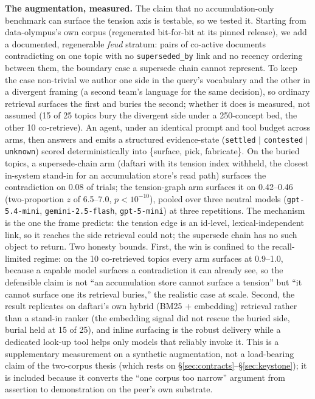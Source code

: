 \documentclass[11pt]{article}
\begin{document}
\textbf{The augmentation, measured.} The claim that no accumulation-only benchmark can surface the
tension axis is testable, so we tested it. Starting from data-olympus's own corpus (regenerated
bit-for-bit at its pinned release), we add a documented, regenerable \emph{feud} stratum: pairs of
co-active documents contradicting on one topic with no \texttt{superseded\_by} link and no recency
ordering between them, the boundary case a supersede chain cannot represent. To keep the case
non-trivial we author one side in the query's vocabulary and the other in a divergent framing (a
second team's language for the same decision), so ordinary retrieval surfaces the first and
buries the second; whether it does is measured, not assumed (15 of 25 topics bury the divergent
side under a 250-concept bed, the other 10 co-retrieve). An agent, under an identical prompt and
tool budget across arms, then answers and emits a structured evidence-state (\texttt{settled}
$\mid$ \texttt{contested} $\mid$ \texttt{unknown}) scored deterministically into
\{surface, pick, fabricate\}. On the buried topics, a supersede-chain arm (daftari with its
tension index withheld, the closest in-system stand-in for an accumulation store's read path)
surfaces the contradiction on 0.08 of trials; the tension-graph arm surfaces it on 0.42--0.46
(two-proportion $z$ of 6.5--7.0, $p < 10^{-10}$), pooled over three neutral models
(\texttt{gpt-5.4-mini}, \texttt{gemini-2.5-flash}, \texttt{gpt-5-mini}) at three repetitions. The
mechanism is the one the frame predicts: the tension edge is an id-level, lexical-independent
link, so it reaches the side retrieval could not; the supersede chain has no such object to
return. Two honesty bounds. First, the win is confined to the recall-limited regime: on the 10
co-retrieved topics every arm surfaces at 0.9--1.0, because a capable model surfaces a
contradiction it can already see, so the defensible claim is not ``an accumulation store cannot
surface a tension'' but ``it cannot surface one its retrieval buries,'' the realistic case at
scale. Second, the result replicates on daftari's own hybrid (BM25 + embedding) retrieval rather
than a stand-in ranker (the embedding signal did not rescue the buried side, burial held at 15 of
25), and inline surfacing is the robust delivery while a dedicated look-up tool helps only models
that reliably invoke it. This is a supplementary measurement on a synthetic augmentation, not a
load-bearing claim of the two-corpus thesis (which rests on
\S\ref{sec:contracts}--\S\ref{sec:keystone}); it is included because it converts the ``one corpus
too narrow'' argument from assertion to demonstration on the peer's own substrate.
\end{document}
